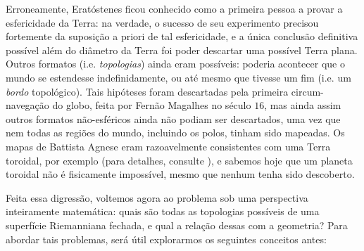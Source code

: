 Erroneamente, Eratóstenes ficou conhecido como a primeira pessoa a provar a esfericidade da Terra: na verdade, o sucesso de seu experimento precisou fortemente da suposição a priori de tal esfericidade, e a única conclusão definitiva possível além do diâmetro da Terra foi poder descartar uma possível Terra plana. Outros formatos (i.e. \emph{topologias}) ainda eram possíveis: poderia acontecer que o  mundo se estendesse indefinidamente, ou até mesmo que tivesse um fim (i.e. um \emph{bordo} topológico). Tais hipóteses foram descartadas pela primeira circum-navegação do globo, feita por Fernão Magalhes no século $16$, mas ainda assim outros formatos não-esféricos ainda não podiam ser descartados, uma vez que nem todas as regiões do mundo, incluindo os polos, tinham sido mapeadas. Os mapas de Battista Agnese eram razoavelmente consistentes com uma Terra toroidal, por exemplo (para detalhes, consulte ), e sabemos hoje que um planeta toroidal não é fisicamente impossível, mesmo que nenhum tenha sido descoberto. \par 
Feita essa digressão, voltemos agora ao problema sob uma perspectiva inteiramente matemática: quais são todas as topologias possíveis de uma superfície Riemanniana fechada, e qual a relação dessas com a geometria? Para abordar tais problemas, será útil explorarmos os seguintes conceitos antes: 
